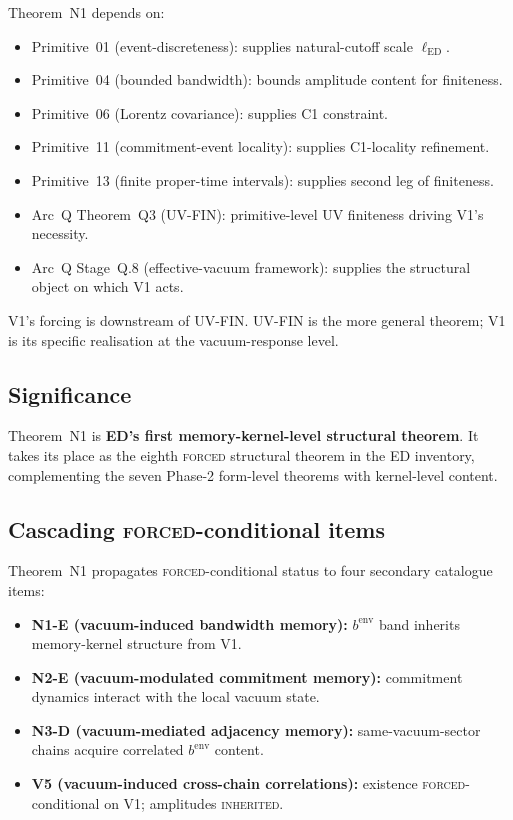 \documentclass[11pt,a4paper]{article}
\begin{document}
Theorem~N1 depends on:
\begin{itemize}
  \item Primitive~01 (event-discreteness): supplies natural-cutoff scale $\ell_\mathrm{ED}$.
  \item Primitive~04 (bounded bandwidth): bounds amplitude content for finiteness.
  \item Primitive~06 (Lorentz covariance): supplies C1 constraint.
  \item Primitive~11 (commitment-event locality): supplies C1-locality refinement.
  \item Primitive~13 (finite proper-time intervals): supplies second leg of finiteness.
  \item Arc~Q Theorem~Q3 (UV-FIN): primitive-level UV finiteness driving V1's necessity.
  \item Arc~Q Stage~Q.8 (effective-vacuum framework): supplies the structural object on which V1 acts.
\end{itemize}

V1's forcing is downstream of UV-FIN. UV-FIN is the more general theorem; V1 is its specific realisation at the vacuum-response level.

\subsection{Significance}

Theorem~N1 is \textbf{ED's first memory-kernel-level structural theorem}. It takes its place as the eighth \textsc{forced} structural theorem in the ED inventory, complementing the seven Phase-2 form-level theorems with kernel-level content.

\subsection{Cascading \textsc{forced}-conditional items}

Theorem~N1 propagates \textsc{forced}-conditional status to four secondary catalogue items:
\begin{itemize}
  \item \textbf{N1-E (vacuum-induced bandwidth memory):} $b^\mathrm{env}$ band inherits memory-kernel structure from V1.
  \item \textbf{N2-E (vacuum-modulated commitment memory):} commitment dynamics interact with the local vacuum state.
  \item \textbf{N3-D (vacuum-mediated adjacency memory):} same-vacuum-sector chains acquire correlated $b^\mathrm{env}$ content.
  \item \textbf{V5 (vacuum-induced cross-chain correlations):} existence \textsc{forced}-conditional on V1; amplitudes \textsc{inherited}.
\end{itemize}
\end{document}
